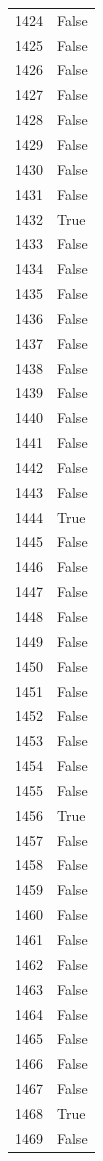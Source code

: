 \documentclass[
  letterpaper,
  DIV=11,
  numbers=noendperiod]{scrreprt}
\begin{document}
\begin{tabular}{ll}
1424 &  False \\
1425 &  False \\
1426 &  False \\
1427 &  False \\
1428 &  False \\
1429 &  False \\
1430 &  False \\
1431 &  False \\
1432 &   True \\
1433 &  False \\
1434 &  False \\
1435 &  False \\
1436 &  False \\
1437 &  False \\
1438 &  False \\
1439 &  False \\
1440 &  False \\
1441 &  False \\
1442 &  False \\
1443 &  False \\
1444 &   True \\
1445 &  False \\
1446 &  False \\
1447 &  False \\
1448 &  False \\
1449 &  False \\
1450 &  False \\
1451 &  False \\
1452 &  False \\
1453 &  False \\
1454 &  False \\
1455 &  False \\
1456 &   True \\
1457 &  False \\
1458 &  False \\
1459 &  False \\
1460 &  False \\
1461 &  False \\
1462 &  False \\
1463 &  False \\
1464 &  False \\
1465 &  False \\
1466 &  False \\
1467 &  False \\
1468 &   True \\
1469 &  False \\

\end{tabular}
\end{document}
